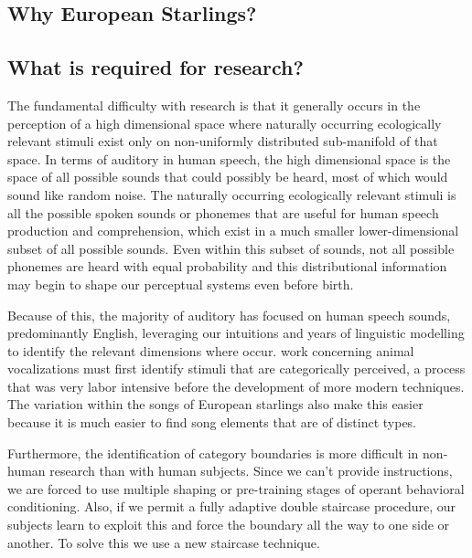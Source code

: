 \subsection{Why European Starlings?}

\subsection{What is required for \CP research?}

The fundamental difficulty with \CP research is that it generally occurs in the perception of a high dimensional space where naturally occurring ecologically relevant stimuli exist only on non-uniformly distributed sub-manifold of that space. In terms of auditory \CP in human speech, the high dimensional space is the space of all possible sounds that could possibly be heard, most of which would sound like random noise. The naturally occurring ecologically relevant stimuli is all the possible spoken sounds or phonemes that are useful for human speech production and comprehension, which exist in a much smaller lower-dimensional subset of all possible sounds. Even within this subset of sounds, not all possible phonemes are heard with equal probability and this distributional information may begin to shape our perceptual systems even before birth.

Because of this, the majority of auditory \CP has focused on human speech sounds, predominantly English, leveraging our intuitions and years of linguistic modelling to identify the relevant dimensions where \CP occur. \CP work concerning animal vocalizations must first identify stimuli that are categorically perceived, a process that was very labor intensive\cite{swamp sparrow series of papers} before the development of more modern techniques\cite{Tim's paper on distribution}. The variation within the songs of European starlings also make this easier because it is much easier to find song elements that are of distinct types.

Furthermore, the identification of category boundaries is more difficult in non-human research than with human subjects. Since we can't provide instructions, we are forced to use multiple shaping or pre-training stages of operant behavioral conditioning. Also, if we permit a fully adaptive double staircase procedure, our subjects learn to exploit this and force the boundary all the way to one side or another. To solve this we use a new staircase technique.

